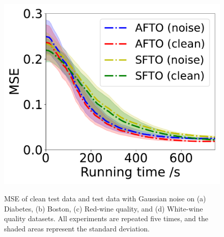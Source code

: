 \documentclass[letterpaper]{article} %
\begin{document}
\begin{figure}[t]
{\begin{minipage}{4.2cm}
\label{fig:dis-red}
\includegraphics[scale=0.215]{dis-red.pdf}
\end{minipage}}
\caption{MSE of clean test data and test data with Gaussian noise
on (a) Diabetes, (b) Boston, (c) Red-wine quality, and (d) White-wine quality datasets. All experiments are repeated five times, and the shaded areas represent the standard deviation.} %
\label{fig:dis-hyper}
\end{figure}
\end{document}
